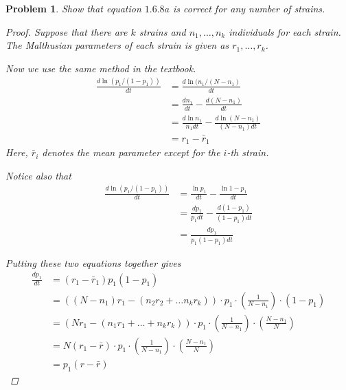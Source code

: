 \documentclass[12pt]{report}
\newtheorem{problem}{Problem}[chapter]
\begin{document}
    \begin{problem}
        Show that equation $1.6.8a$ is correct for any number of strains.
        \begin{proof}
            Suppose that there are $k$ strains and $n_1, \ldots, n_k$ individuals for each strain. The Malthusian parameters of each strain is given as $r_1, \ldots, r_k$.

            Now we use the same method in the textbook.
            \begin{equation*}
                \begin{split}
                    \frac{d \ln(p_1/(1-p_1))}{dt}
                    &= \frac{d \ln(n_1/(N-n_1)}{dt}  \\
                    &= \frac{d n_1}{dt} - \frac{d (N-n_1)}{dt} \\
                    &= \frac{d \ln{n_1}}{n_1 dt} - \frac{d \ln(N-n_1)}{(N-n_1) dt} \\
                    &= r_1 - \bar{r}_1
                \end{split}
            \end{equation*}
            Here, $\bar{r}_i$ denotes the mean parameter except for the $i$-th strain. 

            Notice also that
            \begin{equation*}
                \begin{split}
                    \frac{d \ln(p_1/(1-p_1))}{dt}
                    &= \frac{\ln{p_1}}{dt} - \frac{\ln{1-p_1}}{dt} \\
                    &= \frac{d p_1}{p_1 dt} - \frac{d (1-p_1)}{(1-p_1)dt} \\
                    & = \frac{dp_1}{p_1(1-p_1)dt}
                \end{split}
            \end{equation*}

            Putting these two equations together gives
            \begin{equation*}
                \begin{split}
                    \frac{dp_1}{dt} 
                    &= (r_1-\bar{r}_1)p_1(1-p_1) \\
                    &= ((N-n_1)r_1 - (n_2r_2 + \ldots n_kr_k)) \cdot p_1 \cdot
                    \left(\frac{1}{N-n_1}\right) \cdot (1-p_1) \\
                    &= (Nr_1 - (n_1r_1 + \ldots + n_kr_k)) \cdot p_1 \cdot
                    \left(\frac{1}{N-n_1}\right) \cdot 
                    \left(\frac{N-n_1}{N}\right) \\
                    &= N(r_1 - \bar{r}) \cdot p_1 \cdot
                    \left(\frac{1}{N-n_1}\right) \cdot 
                    \left(\frac{N-n_1}{N}\right) \\
                    &= p_1(r-\bar{r})
                \end{split}
            \end{equation*}
        \end{proof}


    \end{problem}
\end{document}
